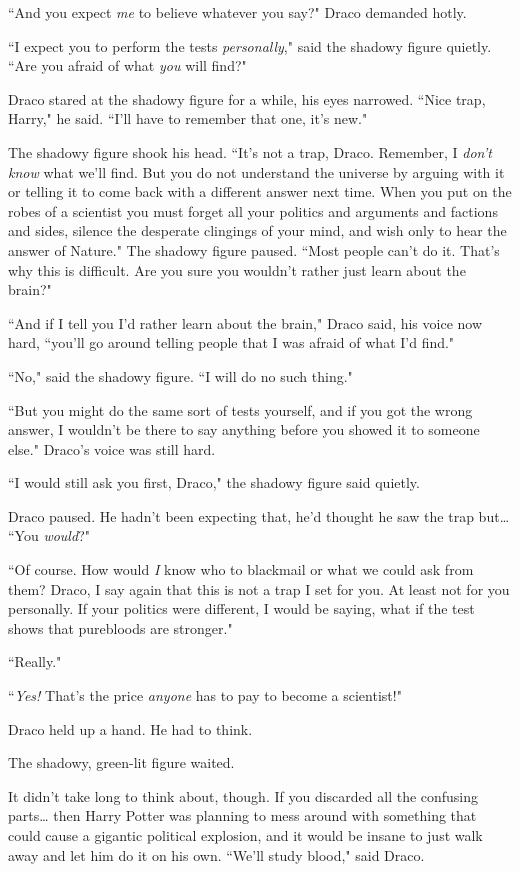 ``And you expect \emph{me} to believe whatever you say?" Draco demanded hotly.

``I expect you to perform the tests \emph{personally}," said the shadowy figure quietly. ``Are you afraid of what \emph{you} will find?"

Draco stared at the shadowy figure for a while, his eyes narrowed. ``Nice trap, Harry," he said. ``I'll have to remember that one, it's new."

The shadowy figure shook his head. ``It's not a trap, Draco. Remember, I \emph{don't know} what we'll find. But you do not understand the universe by arguing with it or telling it to come back with a different answer next time. When you put on the robes of a scientist you must forget all your politics and arguments and factions and sides, silence the desperate clingings of your mind, and wish only to hear the answer of Nature." The shadowy figure paused. ``Most people can't do it. That's why this is difficult. Are you sure you wouldn't rather just learn about the brain?"

``And if I tell you I'd rather learn about the brain," Draco said, his voice now hard, ``you'll go around telling people that I was afraid of what I'd find."

``No," said the shadowy figure. ``I will do no such thing."

``But you might do the same sort of tests yourself, and if you got the wrong answer, I wouldn't be there to say anything before you showed it to someone else." Draco's voice was still hard.

``I would still ask you first, Draco," the shadowy figure said quietly.

Draco paused. He hadn't been expecting that, he'd thought he saw the trap but{\ldots} ``You \emph{would}?"

``Of course. How would \emph{I} know who to blackmail or what we could ask from them? Draco, I say again that this is not a trap I set for you. At least not for you personally. If your politics were different, I would be saying, what if the test shows that purebloods are stronger."

``Really."

``\emph{Yes!} That's the price \emph{anyone} has to pay to become a scientist!"

Draco held up a hand. He had to think.

The shadowy, green-lit figure waited.

It didn't take long to think about, though. If you discarded all the confusing parts{\ldots} then Harry Potter was planning to mess around with something that could cause a gigantic political explosion, and it would be insane to just walk away and let him do it on his own. ``We'll study blood," said Draco.

